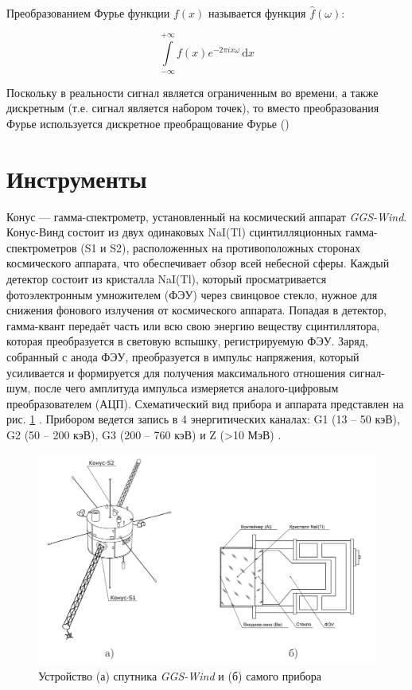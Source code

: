 		
		Преобразованием Фурье функции $f(x)$ называется функция $\widehat{f}(\omega)$:
		
		\begin{equation}
			\int\limits^{+\infty}_{-\infty} f(x) e^{-2 \pi i x \omega} \, \mathrm{d} x
		\end{equation}		 
		
		Поскольку в реальности сигнал является ограниченным во времени, а также дискретным (т.е. сигнал является набором точек), то вместо преобразования Фурье используется дискретное преобращование Фурье ()
		

\section{Инструменты}
	
	Конус --- гамма-спектрометр, установленный на космический аппарат \textit{GGS-Wind}. Конус-Винд состоит из двух одинаковых NaI(Tl) сцинтилляционных гамма-спектрометров (S1 и S2), расположенных на противоположных сторонах космического аппарата, что обеспечивает обзор всей небесной сферы. Каждый детектор состоит из кристалла NaI(Tl), который  просматривается фотоэлектронным умножителем (ФЭУ) через свинцовое стекло, нужное для снижения фонового излучения от космического аппарата. Попадая в детектор, гамма-квант передаёт часть или всю свою энергию
веществу сцинтиллятора, которая преобразуется в световую вспышку, регистрируемую ФЭУ. Заряд, собранный с анода ФЭУ, преобразуется в импульс напряжения, который усиливается и формируется для получения максимального отношения сигнал-шум, после чего амплитуда импульса измеряется аналого-цифровым преобразователем (АЦП). Схематический вид прибора и аппарата представлен на рис. \ref{img:kw1} \cite{Svinkin_thesis}. Прибором ведется запись в 4 энергитических каналах: G1 (13 -- 50 кэВ), G2 (50 -- 200 кэВ), G3 (200 -- 760 кэВ) и Z (>10 МэВ) \cite{aptekarr.l.1993}.

	\begin{figure}[h!]
		\centering
		\includegraphics[width = 0.75\linewidth]{pictures/Konus-Wind.png}
		\caption{Устройство (а) спутника \textit{GGS-Wind} и (б) самого прибора}
		\label{img:kw1}
	\end{figure}
	
